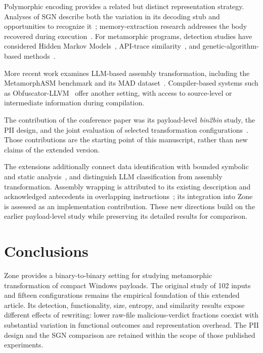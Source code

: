 \documentclass[runningheads]{llncs}
\begin{document}
Polymorphic encoding provides a related but distinct representation strategy. Analyses of SGN describe both the variation in its decoding stub and opportunities to recognize it~\cite{sgn64,sgnstrong}; memory-extraction research addresses the body recovered during execution~\cite{codeExtraction}. For metamorphic programs, detection studies have considered Hidden Markov Models~\cite{wong2006hunting,desai2010highly}, API-trace similarity~\cite{identifyingmeth}, and genetic-algorithm-based methods~\cite{methgenetic}.

More recent work examines LLM-based assembly transformation, including the MetamorphASM benchmark and its MAD dataset~\cite{llmobf,llm2}. Compiler-based systems such as Obfuscator-LLVM~\cite{llvmobf} offer another setting, with access to source-level or intermediate information during compilation.

The contribution of the conference paper was its payload-level \emph{bin2bin} study, the PII design, and the joint evaluation of selected transformation configurations~\cite{zone_secrypt_2026}. Those contributions are the starting point of this manuscript, rather than new claims of the extended version.


The extensions additionally connect data identification with bounded
symbolic and static analysis~\cite{angr_cfg_docs}, and distinguish LLM
classification from assembly transformation. Assembly wrapping is
attributed to its existing description and acknowledged antecedents
in overlapping instructions~\cite{assembly_wrapping}; its integration
into Zone is assessed as an implementation contribution. These new
directions build on the earlier payload-level study while preserving
its detailed results for comparison.

\section{Conclusions}\label{sec:conclusion3}
Zone provides a binary-to-binary setting for studying metamorphic
transformation of compact Windows payloads. The original study of
102 inputs and fifteen configurations remains the empirical foundation
of this extended article. Its detection, functionality, size, entropy,
and similarity results expose different effects of rewriting:
lower raw-file malicious-verdict fractions coexist with substantial
variation in functional outcomes and representation overhead.
The PII design and the SGN comparison are retained within the scope
of those published experiments.
\end{document}

